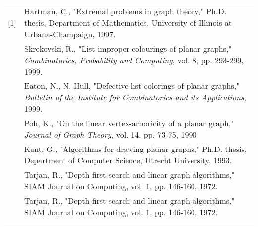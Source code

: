 \documentclass[11pt,letter]{article}
\begin{document}
\begin{tabularx}{\linewidth}{lX}
[1] & Hartman, C., "Extremal problems in graph theory," Ph.D. thesis, Department of Mathematics,
University of Illinois at Urbana-Champaign, 1997.\\\relax
[2] & Skrekovski, R., "List improper colourings of planar graphs,"
\emph{Combinatorics, Probability and Computing}, vol. 8, pp. 293-299, 1999.\\\relax
[3] & Eaton, N., N. Hull, "Defective list colorings of planar graphs,"
\emph{Bulletin of the Institute for Combinatorics and its Applications}, 1999.\\\relax
[4] & Poh, K., "On the linear vertex-arboricity of a planar graph," \emph{Journal of Graph Theory},
vol. 14, pp. 73-75, 1990\\\relax
[5] & Kant, G., "Algorithms for drawing planar graphs," Ph.D. thesis, Department of Computer Science,
Utrecht University, 1993.\\\relax
[6] & Tarjan, R., "Depth-first search and linear graph algorithms," SIAM Journal on Computing, vol. 1, pp.
146-160, 1972.\\\relax
[6] & Tarjan, R., "Depth-first search and linear graph algorithms," SIAM Journal on Computing, vol. 1, pp.
146-160, 1972.\\\relax
\end{tabularx}
\end{document}
